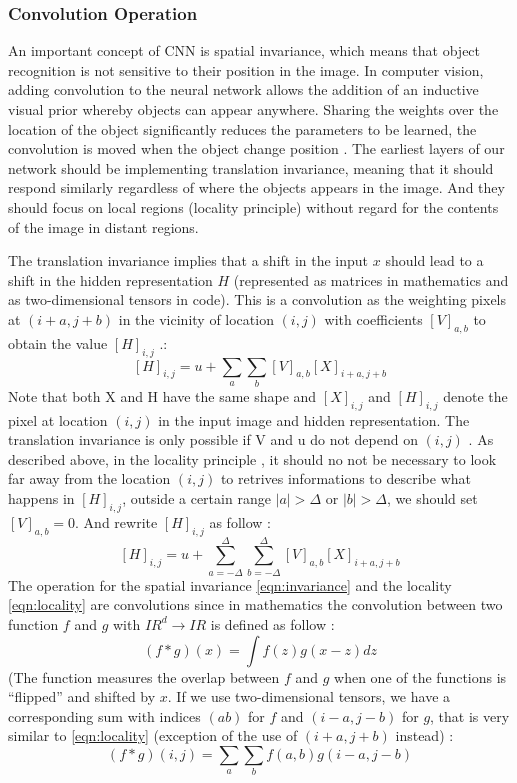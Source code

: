 \documentclass[12pt,a4paper]{scrartcl}
\begin{document}
\subsubsection{Convolution Operation}
An important concept of CNN is spatial invariance, which means that object recognition is not sensitive to their position in the image. In computer vision, adding convolution to the neural network allows the addition of an inductive visual prior whereby objects can appear anywhere.  Sharing the weights over the location of the object significantly reduces the parameters to be learned, the convolution is moved when the object change position \cite{CNNSpatialLocation}. The earliest layers of our network should be implementing translation invariance, meaning that it should respond similarly  regardless of where the objects appears in the image. And they should focus on local regions (locality principle) without regard for the contents of the image in distant regions. \cite{DIDLBook}

The translation invariance implies that a shift in the input \(x\) should lead to a shift in the hidden representation \(H\) (represented as matrices in mathematics and as two-dimensional tensors in code). 
This is a convolution as the weighting pixels at \((i + a, j + b)\) in the vicinity of location
\((i, j)\) with coefficients \([V]_{a,b}\) to obtain the value \([H]_{i,j}\) .: 
\begin{equation}
\label{eqn:invariance}
[H]_{i,j} = u + \sum_a\sum_b[V]_{a,b}[X]_{i+a,j+b}
\end{equation}
Note that both X and H have the same shape and \([X]_{i,j}\) and \([H]_{i,j}\) denote the pixel at location \((i, j)\) in the input image and hidden representation. The translation invariance is only possible if V and u do not depend on \((i, j)\) \cite{DIDLBook}.
As described above, in the locality principle , it should no not be necessary to look far away from the location \((i, j)\) to retrives informations to describe what happens in \([H]_{i,j}\), outside a certain range \(|a| > \Delta \) or \(|b| > \Delta\), we should set  \([V]_{a,b} = 0\). And rewrite \([H]_{i,j}\) as follow \cite{DIDLBook}:
\begin{equation}
\label{eqn:locality}
[H]_{i,j} = u + \sum_{a=-\Delta}^{\Delta}\sum_{b=-\Delta}^{\Delta}[V]_{a,b}[X]_{i+a,j+b}
\end{equation}
The operation for the spatial invariance \ref{eqn:invariance} and the locality \ref{eqn:locality} are convolutions since in mathematics the convolution between two function \(f\) and \(g\) with \({ I\!R}^d \rightarrow { I\!R}\) is defined as follow \cite{DIDLBook}: 
\begin{equation}
(f*g)(x) = \int f(z)g(x-z)dz
\end{equation}
(The function measures the overlap between \(f\) and \(g\) when one of the functions is “flipped” and shifted by \(x\). If we use two-dimensional tensors, we have a corresponding sum with indices \((a b)\) for \(f\) and \((i-a, j-b)\) for \(g\), that is very similar to \ref{eqn:locality} (exception of the use of \((i+a, j+b)\) instead) \cite{DIDLBook}:
\begin{equation}
(f*g)(i,j) = \sum_{a}\sum_{b} f(a,b)g(i-a,j-b)
\end{equation}
\end{document}
